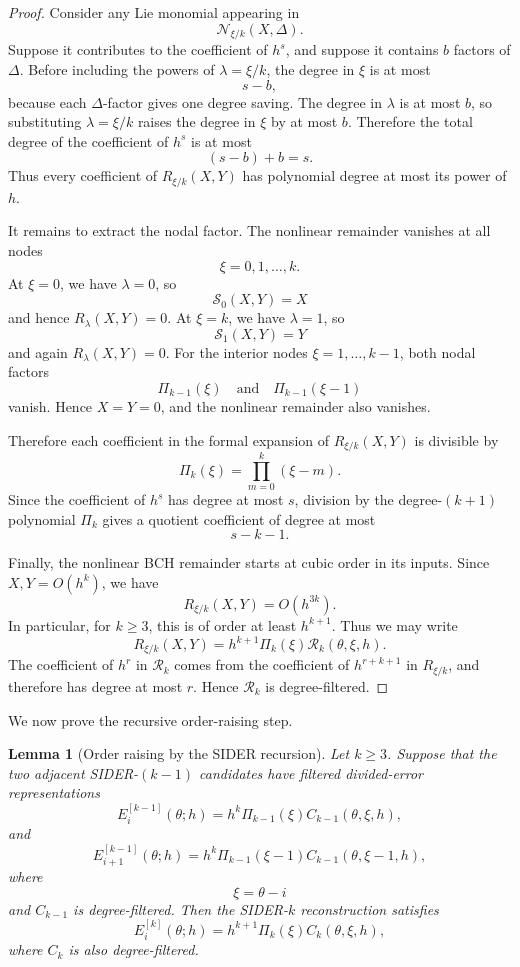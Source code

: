 \documentclass[a4paper,11pt]{article}
\numberwithin{equation}{section}
\theoremstyle{plain}
\newtheorem{lemma}[thm]{Lemma}
\theoremstyle{definition}
\theoremstyle{remark}
\begin{document}
\begin{proof}
Consider any Lie monomial appearing in
\[
        \mathcal N_{\xi/k}(X,\Delta).
\]
Suppose it contributes to the coefficient of \(h^s\), and suppose it contains
\(b\) factors of \(\Delta\).  Before including the powers of
\(\lambda=\xi/k\), the degree in \(\xi\) is at most
\[
        s-b,
\]
because each \(\Delta\)-factor gives one degree saving.  The degree in
\(\lambda\) is at most \(b\), so substituting \(\lambda=\xi/k\) raises the
degree in \(\xi\) by at most \(b\).  Therefore the total degree of the
coefficient of \(h^s\) is at most
\[
        (s-b)+b=s.
\]
Thus every coefficient of \(R_{\xi/k}(X,Y)\) has polynomial degree at most its
power of \(h\).

It remains to extract the nodal factor.  The nonlinear remainder vanishes at
all nodes
\[
        \xi=0,1,\ldots,k.
\]
At \(\xi=0\), we have \(\lambda=0\), so
\[
        \mathcal S_0(X,Y)=X
\]
and hence \(R_\lambda(X,Y)=0\).  At \(\xi=k\), we have \(\lambda=1\), so
\[
        \mathcal S_1(X,Y)=Y
\]
and again \(R_\lambda(X,Y)=0\).  For the interior nodes
\(\xi=1,\ldots,k-1\), both nodal factors
\[
        \Pi_{k-1}(\xi)
        \quad\text{and}\quad
        \Pi_{k-1}(\xi-1)
\]
vanish.  Hence \(X=Y=0\), and the nonlinear remainder also vanishes.

Therefore each coefficient in the formal expansion of \(R_{\xi/k}(X,Y)\) is
divisible by
\[
        \Pi_k(\xi)=\prod_{m=0}^{k}(\xi-m).
\]
Since the coefficient of \(h^s\) has degree at most \(s\), division by the
degree-\((k+1)\) polynomial \(\Pi_k\) gives a quotient coefficient of degree
at most
\[
        s-k-1.
\]

Finally, the nonlinear BCH remainder starts at cubic order in its inputs.
Since \(X,Y=O(h^k)\), we have
\[
        R_{\xi/k}(X,Y)=O(h^{3k}).
\]
In particular, for \(k\geq3\), this is of order at least \(h^{k+1}\).  Thus we
may write
\[
        R_{\xi/k}(X,Y)
        =
        h^{k+1}\Pi_k(\xi)\mathcal R_k(\theta,\xi,h).
\]
The coefficient of \(h^r\) in \(\mathcal R_k\) comes from the coefficient of
\(h^{r+k+1}\) in \(R_{\xi/k}\), and therefore has degree at most \(r\).  Hence
\(\mathcal R_k\) is degree-filtered.
\end{proof}

We now prove the recursive order-raising step.

\begin{lemma}[Order raising by the SIDER recursion]
\label{lem:order_raising}
Let \(k\geq3\).  Suppose that the two adjacent SIDER-\((k-1)\) candidates
have filtered divided-error representations
\[
        E_i^{[k-1]}(\theta;h)
        =
        h^k\Pi_{k-1}(\xi)C_{k-1}(\theta,\xi,h),
\]
and
\[
        E_{i+1}^{[k-1]}(\theta;h)
        =
        h^k\Pi_{k-1}(\xi-1)C_{k-1}(\theta,\xi-1,h),
\]
where
\[
        \xi=\theta-i
\]
and \(C_{k-1}\) is degree-filtered.  Then the SIDER-\(k\) reconstruction
satisfies
\[
        E_i^{[k]}(\theta;h)
        =
        h^{k+1}\Pi_k(\xi)C_k(\theta,\xi,h),
\]
where \(C_k\) is also degree-filtered.
\end{lemma}
\end{document}
